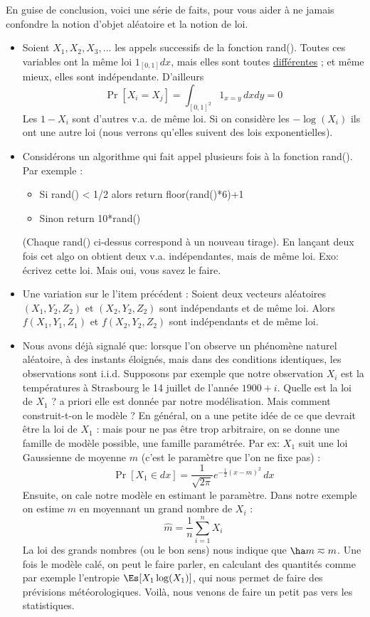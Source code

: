 \documentclass{article}
\begin{document}
En guise de conclusion, voici une série de faits, pour vous aider à ne jamais confondre la notion d'objet aléatoire et la notion de loi.
\begin{itemize}

\item Soient $X_1,X_2,X_3,...$ les appels successifs de la fonction rand(). Toutes ces variables ont  la même loi $1_{[0,1]} dx$,  mais elles sont  toutes \underline{différentes} ; et même mieux, elles sont indépendante. D'ailleurs 
$$
\Pr[X_i=X_j]= \int_{[0,1]^2} 1_{x=y} \,   dx dy  = 0 
$$
 Les  $1-X_i$ sont d'autres v.a. de même loi.     Si on considère les $-\log(X_i)$   ils ont une autre loi (nous verrons qu'elles suivent des lois exponentielles).    

\item Considérons un algorithme qui fait appel plusieurs fois à la fonction rand(). Par exemple :
\begin{itemize}
\item Si rand() < 1/2 alors return   floor(rand()*6)+1  
\item Sinon return 10*rand() 
\end{itemize}
(Chaque rand() ci-dessus correspond à un nouveau tirage).  En lançant deux fois cet algo on obtient deux v.a. indépendantes, mais de même loi. Exo: écrivez cette loi. Mais oui, vous savez le faire.  


\item Une variation sur le l'item précédent :   Soient deux vecteurs aléatoires $(X_1,Y_2,Z_2)$ et $(X_2,Y_2,Z_2)$ sont indépendants et de même loi. Alors $f(X_1,Y_1,Z_1)$ et $f(X_2,Y_2,Z_2)$ sont indépendants et de même loi.  

\item Nous avons déjà signalé que: lorsque l'on observe un phénomène naturel aléatoire, à des instants éloignés, mais dans des conditions identiques, les observations sont i.i.d. Supposons par exemple que notre observation  $X_i$ est la températures à Strasbourg  le 14 juillet de l'année $1900 + i $.            Quelle est la loi de $X_1$ ? a priori elle est donnée par notre modélisation.  Mais comment construit-t-on le modèle ?  En général, on a une petite idée de ce que devrait être la loi de $X_1$ : mais pour ne pas être trop arbitraire, on se donne une famille de modèle possible, une famille paramétrée.  Par ex:  $X_1$ suit une loi Gaussienne de moyenne $m$ (c'est le paramètre que l'on ne fixe pas) :
$$
\Pr[X_1\in dx] = \frac 1 {\sqrt{2\pi}} e^{-\frac 12 (x-m)^2} \, dx
$$ 
Ensuite, on cale notre modèle en estimant le  paramètre.  Dans notre exemple on estime $m$ en moyennant un grand nombre de $X_i$ :
$$
\hat m = \frac 1 n \sum_{i=1}^n X_i 
$$
 La loi des grands nombres (ou le bon sens) nous indique que $\ha m \eqsim m$.  Une fois le modèle calé, on peut le faire parler, en calculant des quantités comme par exemple l'entropie $\Es[X_1 \log ( X_1)]$, qui nous permet de faire des prévisions météorologiques.  
   Voilà, nous venons de faire un petit pas vers les statistiques. 
\end{itemize}
\end{document}
